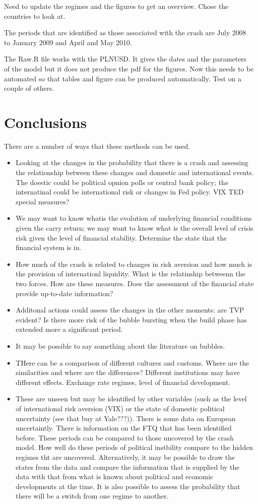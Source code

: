\documentclass[12pt, a4paper, oneside]{article} %
\begin{document}
Need to update the regimes and the figures to get an overview.  Chose the countries to look at. 

The periods that are identified as those associated with the crash are July 2008 to January 2009 and April and May 2010.  

The Raw.R file works with the PLNUSD.  It gives the dates and the parameters of the model but it does not produce the pdf for the figures. Now this needs to be automated so that tables and figure can be produced automatically. Test on a couple of others. 

\section{Conclusions}
There are a number of ways that these methods can be used. 
\begin{itemize}
\item Looking at the changes in the probability that there is a crash and assessing the relationship between these changes and domestic and international events.  The doestic could be political opnion polls or central bank policy; the internatinal could be international risk or changes in Fed policy.   VIX TED special measures?  
\item We may want to know whatis the evolution of underlying financial conditions given the carry return; we may want to know what is the overall level of crisis risk given the level of financial stability.  Determine the state that the financial system is in. 
\item How much of the crash is related to changes in risk aversion and how much is the provision of internationl liquidity.  What is the relatinship betweenn the two forces. How are these measures.  Does the assessment of the financial state provide up-to-date information? 
\item Additonal actions could assess the changes in the other moments:  are TVP evident?  Is there more risk of the bubble bursting when the build phase has extended more a significant period. 
\item It may be possible to say something about the literature on bubbles. 
\item THere can be a comparison of different cultures and customs. Where are the similarities and where are the differences?  Different institutions may have different effects. Exchange rate regimes, level of financial development. 
\item These are unseen but may be identified by other variables (such as the level of international risk aversion (VIX) or the state of domestic political uncertainty (see that buy at Yale???)).  There is some data on European uncertaintly. There is information on the FTQ that has been identified before. These periods can be compared to those uncovered by the crash model.  How well do these periods of political instbility compare to the hidden regimes tht are uncovered.  Alternatively, it may be possible to draw the states from the data and compare the information that is supplied by the data with that from what is known about political and economic developments at the time.  It is also possible to assess the probability that there will be a switch from one regime to another.

\end{itemize}
\end{document}
